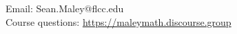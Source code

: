 \documentclass[11pt]{article} %
\begin{document}
\begin{schedule}[Summer 2023]

%
	
	
\end{schedule}

\begin{center}
	{\small Email: Sean.Maley@flcc.edu\\
	Course questions: \url{https://maleymath.discourse.group}}
\end{center}
\end{document}
